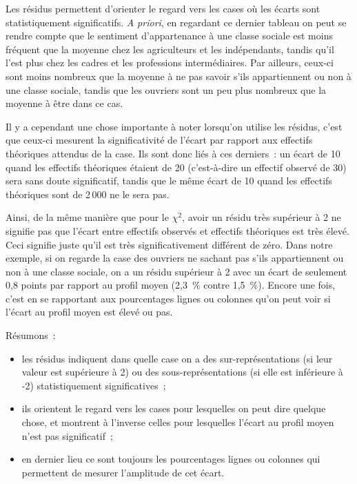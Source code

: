 \documentclass[a4paper,10pt,twoside,francais]{report}
\newcommand{\chid}{$\chi^2$\xspace}
\begin{document}
Les résidus permettent \og d'orienter le regard \fg{} vers les cases où
les écarts sont statistiquement significatifs. \textit{A priori}, en
regardant ce dernier tableau on peut se rendre compte que le sentiment
d'appartenance à une classe sociale est moins fréquent que la moyenne
chez les agriculteurs et les indépendants, tandis qu'il l'est plus
chez les cadres et les professions intermédiaires. Par ailleurs,
ceux-ci sont moins nombreux que la moyenne à ne pas savoir s'ils
appartiennent ou non à une classe sociale, tandis que les ouvriers
sont un peu plus nombreux que la moyenne à être dans ce cas.

Il y a cependant une chose importante à noter lorsqu'on utilise les
résidus, c'est que ceux-ci mesurent la significativité de l'écart
par rapport aux effectifs théoriques attendus de la case. Ils sont
donc liés à ces derniers~: un écart de 10 quand les effectifs
théoriques étaient de 20 (c'est-à-dire un effectif observé de 30) sera
sans doute significatif, tandis que le même écart de 10 quand les
effectifs théoriques sont de 2\,000 ne le sera pas.

Ainsi, de la même manière que pour le \chid, avoir un résidu très
supérieur à 2 ne signifie pas que l'écart entre effectifs observés et
effectifs théoriques est très élevé. Ceci signifie juste qu'il est
très significativement différent de zéro. Dans notre exemple, si on
regarde la case des ouvriers ne sachant pas s'ils appartiennent ou non
à une classe sociale, on a un résidu supérieur à 2 avec un écart de
\og seulement \fg{} 0,8 points par rapport au profil moyen (2,3~\%
contre 1,5~\%). Encore une fois, c'est en se rapportant aux
pourcentages lignes ou colonnes qu'on peut voir si l'écart au profil
moyen est élevé ou pas.

Résumons~:

\begin{itemize}
\item les résidus indiquent dans quelle case on a des
  sur-représentations (si leur valeur est supérieure à 2) ou des
  sous-représentations (si elle est inférieure à -2) statistiquement
  significatives~;
\item ils orientent le regard vers les cases pour lesquelles on peut
  dire quelque chose, et montrent à l'inverse celles pour lesquelles
  l'écart au profil moyen n'est pas significatif~;
\item en dernier lieu ce sont toujours les pourcentages lignes ou
  colonnes qui permettent de mesurer l'amplitude de cet écart.
\end{itemize}
\end{document}
